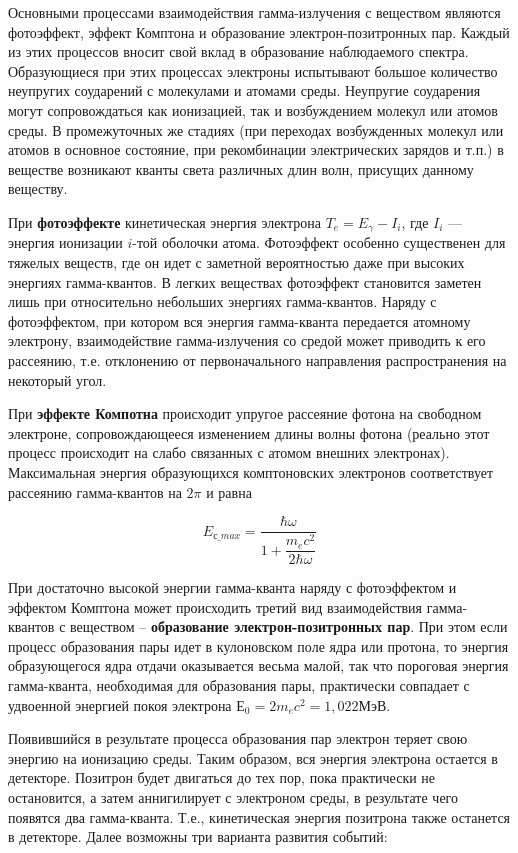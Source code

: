 \documentclass[12pt]{kiarticle}
\newcommand{\ga}{\ensuremath{\gamma}}
\begin{document}
	Основными процессами взаимодействия гамма-излучения с веществом являются фотоэффект, эффект Комптона и образование электрон-позитронных пар. Каждый из этих процессов вносит свой вклад в образование наблюдаемого спектра. Образующиеся при этих процессах электроны испытывают большое количество неупругих соударений с молекулами и атомами среды. Неупругие соударения могут сопровождаться как ионизацией, так и возбуждением молекул или атомов среды. В промежуточных же стадиях (при переходах возбужденных молекул или атомов в основное состояние, при рекомбинации электрических зарядов и т.п.) в веществе возникают кванты света различных длин волн, присущих данному веществу.
	
	При \textbf{фотоэффекте} кинетическая энергия электрона $ T_e = E_\ga - I_i $, где $ I_i $ --- энергия ионизации $ i $-той оболочки атома. Фотоэффект особенно существенен для тяжелых веществ, где он идет с заметной вероятностью даже при высоких энергиях гамма-квантов. В легких веществах фотоэффект становится заметен лишь при относительно небольших энергиях гамма-квантов. Наряду с фотоэффектом, при котором вся энергия гамма-кванта передается атомному электрону, взаимодействие гамма-излучения со средой может приводить к его рассеянию, т.е. отклонению от первоначального направления распространения на некоторый угол.
	
	При \textbf{эффекте Компотна} происходит упругое рассеяние фотона на свободном электроне, сопровождающееся изменением длины волны фотона (реально этот процесс происходит на слабо связанных с атомом внешних электронах). Максимальная энергия образующихся комптоновских электронов соответствует рассеянию гамма-квантов на $ 2\pi $ и равна
	
	\begin{equation}\label{E_compton}
	E_{с \_ max} = \dfrac{\hbar \omega}{1 + \dfrac{m_ec^2}{2\hbar\omega}}
	\end{equation}
	
	При достаточно высокой энергии гамма-кванта наряду с фотоэффектом и эффектом Комптона может происходить третий вид взаимодействия гамма-квантов с веществом – \textbf{образование электрон-позитронных пар}. При этом если процесс образования пары идет в кулоновском поле ядра или протона, то энергия образующегося ядра отдачи оказывается весьма малой, так что пороговая энергия гамма-кванта, необходимая для образования пары, практически совпадает с удвоенной энергией покоя электрона $ Е_0 = 2m_ec^2 =1,022  $МэВ.
	
	Появившийся в результате процесса образования пар электрон теряет свою энергию на ионизацию среды. Таким образом, вся энергия электрона остается в детекторе. Позитрон будет двигаться до тех пор, пока практически не остановится, а затем аннигилирует с электроном среды, в результате чего появятся два гамма-кванта. Т.е., кинетическая энергия позитрона также останется в детекторе. Далее возможны три варианта развития событий:
	
\end{document}
